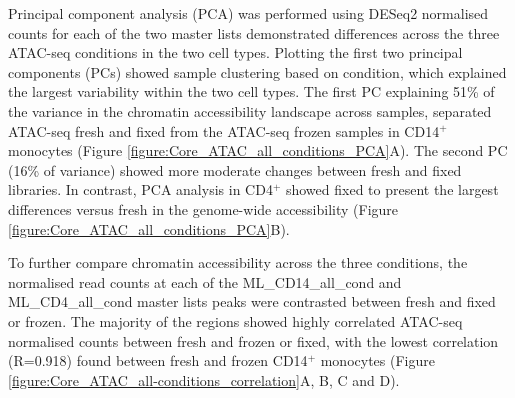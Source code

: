 Principal component analysis (PCA) was performed using DESeq2 normalised counts for each of the two master lists demonstrated differences across the three ATAC-seq conditions in the two cell types. Plotting the first two principal components (PCs) showed sample clustering based on condition, which explained the largest variability within the two cell types. The first PC explaining 51\% of the variance in the chromatin accessibility landscape across samples, separated ATAC-seq fresh and fixed from the ATAC-seq frozen samples in CD14$^+$ monocytes (Figure \ref{figure:Core_ATAC_all_conditions_PCA}A). The second PC (16\% of variance) showed more moderate changes between fresh and fixed libraries. In contrast, PCA analysis in CD4$^+$ showed fixed to present the largest differences versus fresh in the genome-wide accessibility (Figure \ref{figure:Core_ATAC_all_conditions_PCA}B). 


To further compare chromatin accessibility across the three conditions, the normalised read counts at each of the ML\_CD14\_all\_cond and ML\_CD4\_all\_cond master lists peaks were contrasted between fresh and fixed or frozen. The majority of the regions showed highly correlated ATAC-seq normalised counts between fresh and frozen or fixed, with the lowest correlation (R=0.918) found between fresh and frozen CD14$^+$ monocytes (Figure \ref{figure:Core_ATAC_all-conditions_correlation}A, B, C and D). 


